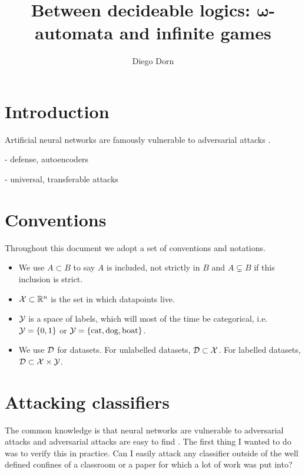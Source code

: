 \documentclass[]{scrarticle}
\title{Between decideable logics: $\mathbf{\omega}$-automata and infinite games}
\author{Diego Dorn}
\begin{document}


\newpage


\section*{Introduction}

Artificial neural networks are famously vulnerable to adversarial attacks
\cite{szegedy2013intriguing,goodfellow2014explaining,liu2021survey}.

- defense, autoencoders

- universal, transferable attacks


\tableofcontents

\clearpage
\section*{Conventions}

Throughout this document we adopt a set of conventions and notations.
\begin{itemize}
  \item We use $A \subset B$ to say $A$ is included, not strictly in $B$
    and $A \subsetneq B$ if this inclusion is strict.
  \item $\mathcal X \subset \mathbb R^n$ is the set in which datapoints live.
  \item $\mathcal Y$ is a space of labels, which will most of the time be categorical,
    i.e. $\mathcal Y = \left\{ 0, 1 \right\}$ or $\mathcal Y = \left\{ \text{cat}, \text{dog}, \text{boat} \right\}$.
  \item We use $\mathcal D$ for datasets. For unlabelled datasets, $\mathcal D \subset \mathcal X$.
    For labelled datasets, $\mathcal D \subset \mathcal X \times \mathcal Y$.
\end{itemize}


\clearpage

\section{Attacking classifiers}
The common knowledge is that neural networks are vulnerable to adversarial attacks
and adversarial attacks are easy to find \cite{szegedy2013intriguing,goodfellow2014explaining,liu2021survey}.
The first thing I wanted to do was to verify this in practice. Can I easily
attack any classifier outside of the well defined confines of a classroom
or a paper for which a lot of work was put into?
\end{document}

